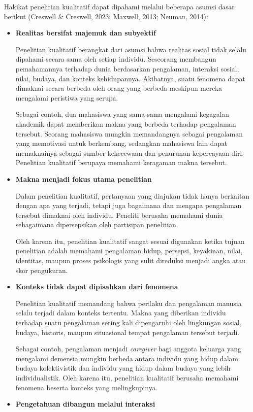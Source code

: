 \documentclass[
  indonesian,
  letterpaper,
  DIV=11,
  numbers=noendperiod]{scrreprt}
\begin{document}
Hakikat penelitian kualitatif dapat dipahami melalui beberapa asumsi
dasar berikut (Creswell \& Creswell, 2023; Maxwell, 2013; Neuman, 2014):

\begin{itemize}
\item
  \textbf{Realitas bersifat majemuk dan subyektif}

  Penelitian kualitatif berangkat dari asumsi bahwa realitas sosial
  tidak selalu dipahami secara sama oleh setiap individu. Seseorang
  membangun pemahamannya terhadap dunia berdasarkan pengalaman,
  interaksi sosial, nilai, budaya, dan konteks kehidupannya. Akibatnya,
  suatu fenomena dapat dimaknai secara berbeda oleh orang yang berbeda
  meskipun mereka mengalami peristiwa yang serupa.

  Sebagai contoh, dua mahasiswa yang sama-sama mengalami kegagalan
  akademik dapat memberikan makna yang berbeda terhadap pengalaman
  tersebut. Seorang mahasiswa mungkin memandangnya sebagai pengalaman
  yang memotivasi untuk berkembang, sedangkan mahasiswa lain dapat
  memaknainya sebagai sumber kekecewaan dan penurunan kepercayaan diri.
  Penelitian kualitatif berupaya memahami keragaman makna tersebut.
\item
  \textbf{Makna menjadi fokus utama penelitian}

  Dalam penelitian kualitatif, pertanyaan yang diajukan tidak hanya
  berkaitan dengan apa yang terjadi, tetapi juga bagaimana dan mengapa
  pengalaman tersebut dimaknai oleh individu. Peneliti berusaha memahami
  dunia sebagaimana dipersepsikan oleh partisipan penelitian.

  Oleh karena itu, penelitian kualitatif sangat sesuai digunakan ketika
  tujuan penelitian adalah memahami pengalaman hidup, persepsi,
  keyakinan, nilai, identitas, maupun proses psikologis yang sulit
  direduksi menjadi angka atau skor pengukuran.
\item
  \textbf{Konteks tidak dapat dipisahkan dari fenomena}

  Penelitian kualitatif memandang bahwa perilaku dan pengalaman manusia
  selalu terjadi dalam konteks tertentu. Makna yang diberikan individu
  terhadap suatu pengalaman sering kali dipengaruhi oleh lingkungan
  sosial, budaya, historis, maupun situasional tempat pengalaman
  tersebut terjadi.

  Sebagai contoh, pengalaman menjadi \emph{caregiver} bagi anggota
  keluarga yang mengalami demensia mungkin berbeda antara individu yang
  hidup dalam budaya kolektivistik dan individu yang hidup dalam budaya
  yang lebih individualistik. Oleh karena itu, penelitian kualitatif
  berusaha memahami fenomena beserta konteks yang melingkupinya.
\item
  \textbf{Pengetahuan dibangun melalui interaksi}


\end{itemize}
\end{document}
